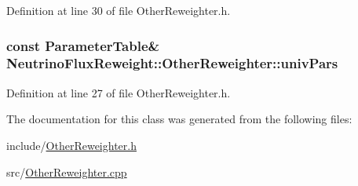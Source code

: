 Definition at line 30 of file Other\-Reweighter.\-h.

\hypertarget{class_neutrino_flux_reweight_1_1_other_reweighter_a2795ccb32eccdca967070a4768b9ca27}{
\subsubsection[{univ\-Pars}]{\setlength{\rightskip}{0pt plus 5cm}const {\bf Parameter\-Table}\& Neutrino\-Flux\-Reweight\-::\-Other\-Reweighter\-::univ\-Pars}}\label{class_neutrino_flux_reweight_1_1_other_reweighter_a2795ccb32eccdca967070a4768b9ca27}


Definition at line 27 of file Other\-Reweighter.\-h.



The documentation for this class was generated from the following files\-:\begin{DoxyCompactItemize}
\item 
include/\hyperlink{_other_reweighter_8h}{Other\-Reweighter.\-h}\item 
src/\hyperlink{_other_reweighter_8cpp}{Other\-Reweighter.\-cpp}\end{DoxyCompactItemize}

